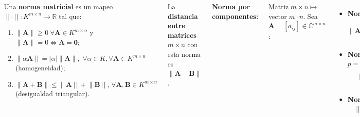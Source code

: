 \documentclass[9pt, aspectratio=169]{beamer}
\begin{document}
\begin{frame}
\begin{columns}[t]
\cx
\begin{definition}
  Una \textbf{norma matricial} es un mapeo $\lVert \cdot \rVert : K^{m \times n} \rightarrow \mathbb{R}$ tal que:
\begin{enumerate}
  \item $\lVert \bm{A} \rVert \geq 0 \; \forall \bm{A} \in K^{m \times n}$ y $\lVert \bm{A} \rVert = 0 \Leftrightarrow \bm{A} = \bm{0}$;
  \item $\lVert \alpha \bm{A} \rVert = |\alpha| \lVert \bm{A} \rVert, \; \forall \alpha \in K, \forall \bm{A} \in K^{m \times n}$ (homogeneidad);
  \item $\lVert \bm{A} + \bm{B} \rVert \leq \lVert \bm{A} \rVert + \lVert \bm{B} \rVert, \, \forall \bm{A}, \bm{B} \in K^{m \times n}$ (desigualdad triangular).
\end{enumerate}
\end{definition}

La \textbf{distancia entre matrices $m \times n$} con esta norma es $\lVert \bm{A} - \bm{B} \rVert$.
\pause

\cx

\textbf{Norma por componentes:}

Matriz $m \times n \mapsto$ vector $m \cdot n$. Sea $\bm{A} = [a_{ij}] \in \mathbb{C}^{m \times n}$:
\begin{itemize}
  \item \textbf{Norma $p$:}
      \[ \lVert \bm{A} \rVert_p = \left( \sum_{i=1}^m \sum_{j=1}^n |a_{ij}|^p \right)^{1/p} \]
  \item \textbf{Norma de Frobenius:} ($p = 2$)
\[ \lVert \bm{A} \rVert_F^2 = \sum_{i=1}^m \sum_{j=1}^n |a_{ij}|^2 \]
\item \textbf{Norma máxima:}
  \[ \lVert \bm{A} \rVert_{\text{máx}} = \max_{\substack{1 \leq i \leq m \\ 1 \leq j \leq n}} |a_{ij}| \]
\end{itemize}

\end{columns}
\end{frame}
\end{document}
